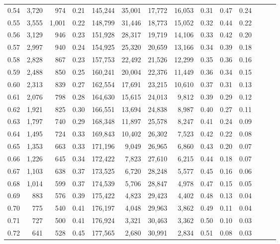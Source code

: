 \begin{tabular}{rrrrrrrrrrrrrr}
0.54 &  3,720 &    974 &  0.21 &  145,244 &   35,001 &  17,772 &  16,053 &  0.31 &  0.47 &      0.24 \\
0.55 &  3,555 &  1,001 &  0.22 &  148,799 &   31,446 &  18,773 &  15,052 &  0.32 &  0.44 &      0.22 \\
0.56 &  3,129 &    946 &  0.23 &  151,928 &   28,317 &  19,719 &  14,106 &  0.33 &  0.42 &      0.20 \\
0.57 &  2,997 &    940 &  0.24 &  154,925 &   25,320 &  20,659 &  13,166 &  0.34 &  0.39 &      0.18 \\
0.58 &  2,828 &    867 &  0.23 &  157,753 &   22,492 &  21,526 &  12,299 &  0.35 &  0.36 &      0.16 \\
0.59 &  2,488 &    850 &  0.25 &  160,241 &   20,004 &  22,376 &  11,449 &  0.36 &  0.34 &      0.15 \\
0.60 &  2,313 &    839 &  0.27 &  162,554 &   17,691 &  23,215 &  10,610 &  0.37 &  0.31 &      0.13 \\
0.61 &  2,076 &    798 &  0.28 &  164,630 &   15,615 &  24,013 &   9,812 &  0.39 &  0.29 &      0.12 \\
0.62 &  1,921 &    825 &  0.30 &  166,551 &   13,694 &  24,838 &   8,987 &  0.40 &  0.27 &      0.11 \\
0.63 &  1,797 &    740 &  0.29 &  168,348 &   11,897 &  25,578 &   8,247 &  0.41 &  0.24 &      0.09 \\
0.64 &  1,495 &    724 &  0.33 &  169,843 &   10,402 &  26,302 &   7,523 &  0.42 &  0.22 &      0.08 \\
0.65 &  1,353 &    663 &  0.33 &  171,196 &    9,049 &  26,965 &   6,860 &  0.43 &  0.20 &      0.07 \\
0.66 &  1,226 &    645 &  0.34 &  172,422 &    7,823 &  27,610 &   6,215 &  0.44 &  0.18 &      0.07 \\
0.67 &  1,103 &    638 &  0.37 &  173,525 &    6,720 &  28,248 &   5,577 &  0.45 &  0.16 &      0.06 \\
0.68 &  1,014 &    599 &  0.37 &  174,539 &    5,706 &  28,847 &   4,978 &  0.47 &  0.15 &      0.05 \\
0.69 &    883 &    576 &  0.39 &  175,422 &    4,823 &  29,423 &   4,402 &  0.48 &  0.13 &      0.04 \\
0.70 &    775 &    540 &  0.41 &  176,197 &    4,048 &  29,963 &   3,862 &  0.49 &  0.11 &      0.04 \\
0.71 &    727 &    500 &  0.41 &  176,924 &    3,321 &  30,463 &   3,362 &  0.50 &  0.10 &      0.03 \\
0.72 &    641 &    528 &  0.45 &  177,565 &    2,680 &  30,991 &   2,834 &  0.51 &  0.08 &      0.03 \\

\end{tabular}
